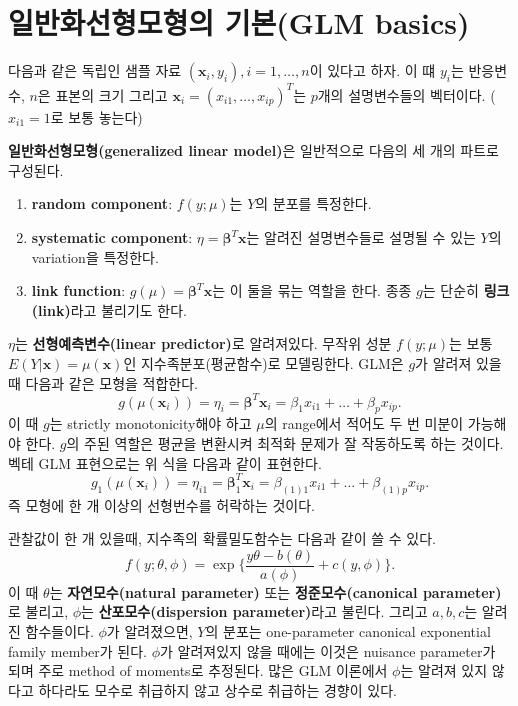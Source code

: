 \documentclass[b5paper,]{scrbook}
\theoremstyle{plain}
\theoremstyle{definition}
\numberwithin{equation}{section}
\begin{document}
\hypertarget{-glm-basics}{%
\section{일반화선형모형의 기본(GLM basics)}\label{-glm-basics}}

다음과 같은 독립인 샘플 자료 \((\mathbf{x}_{i}, y_{i}), i=1,\ldots, n\)이 있다고 하자. 이 떄 \(y_{i}\)는 반응변수, \(n\)은 표본의 크기 그리고 \(\mathbf{x}_{i}=(x_{i1},\ldots, x_{ip})^{T}\)는 \(p\)개의 설명변수들의 벡터이다. (\(x_{i1}=1\)로 보통 놓는다)

\textbf{일반화선형모형(generalized linear model)}은 일반적으로 다음의 세 개의 파트로 구성된다.

\begin{enumerate}
\def\labelenumi{\arabic{enumi}.}
\item
  \textbf{random component}: \(f(y;\mu)\)는 \(Y\)의 분포를 특정한다.
\item
  \textbf{systematic component}: \(\eta = \boldsymbol{\beta}^{T}\mathbf{x}\)는 알려진 설명변수들로 설명될 수 있는 \(Y\)의 variation을 특정한다.
\item
  \textbf{link function}: \(g(\mu)=\boldsymbol{\beta}^{T}\mathbf{x}\)는 이 둘을 묶는 역할을 한다. 종종 \(g\)는 단순히 \textbf{링크(link)}라고 불리기도 한다.
\end{enumerate}

\(\eta\)는 \textbf{선형예측변수(linear predictor)}로 알려져있다. 무작위 성분 \(f(y;\mu)\)는 보통 \(E(Y|\mathbf{x})=\mu(\mathbf{x})\)인 지수족분포(평균함수)로 모델링한다. GLM은 \(g\)가 알려져 있을 때 다음과 같은 모형을 적합한다.
\[g(\mu(\mathbf{x}_{i}))=\eta_{i}=\boldsymbol{\beta}^{T}\mathbf{x}_{i}=\beta_{1}x_{i1}+\ldots+\beta_{p}x_{ip}.\]
이 때 \(g\)는 strictly monotonicity해야 하고 \(\mu\)의 range에서 적어도 두 번 미분이 가능해야 한다. \(g\)의 주된 역할은 평균을 변환시켜 최적화 문제가 잘 작동하도록 하는 것이다. 벡테 GLM 표현으로는 위 식을 다음과 같이 표현한다.
\[g_{1}(\mu(\mathbf{x}_{i}))=\eta_{i1}=\boldsymbol{\beta}_{1}^{T}\mathbf{x}_{i}=\beta_{(1)1}x_{i1}+\ldots+\beta_{(1)p}x_{ip}.\]
즉 모형에 한 개 이상의 선형번수를 허락하는 것이다.

관찰값이 한 개 있을때, 지수족의 확률밀도함수는 다음과 같이 쓸 수 있다.
\[f(y;\theta, \phi)=\exp\{ \frac{y\theta-b(\theta)}{a(\phi)} +c(y,\phi) \}.\]
이 때 \(\theta\)는 \textbf{자연모수(natural parameter)} 또는 \textbf{정준모수(canonical parameter)}로 불리고, \(\phi\)는 \textbf{산포모수(dispersion parameter)}라고 불린다. 그리고 \(a,b,c\)는 알려진 함수들이다. \(\phi\)가 알려졌으면, \(Y\)의 분포는 one-parameter canonical exponential family member가 된다. \(\phi\)가 알려져있지 않을 때에는 이것은 nuisance parameter가 되며 주로 method of moments로 추정된다. 많은 GLM 이론에서 \(\phi\)는 알려져 있지 않다고 하다라도 모수로 취급하지 않고 상수로 취급하는 경향이 있다.
\end{document}
